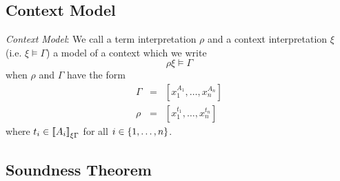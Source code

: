 \subsection{Context Model}

\begin{definition}
    \label{DefinitionContextModel}
    \emph{Context Model}: We call a term interpretation $\rho$ and a context
    interpretation $\xi$ (i.e. $\xi \vDash \Gamma$) a model of a context which
    we write
    $$
        \rho\xi \vDash \Gamma
    $$
    when
    $\rho$ and $\Gamma$ have the form
    $$
    \begin{array}{lll}
        \Gamma &=& [x_1^{A_1}, \ldots, x_n^{A_n}]
        \\
        \rho   &=& [x_1^{t_1}, \ldots, x_n^{t_n}]
    \end{array}
    $$
    where $t_i \in {{[\![}A_i{]\!]}}_{\xi\Gamma}$ for all $i \in {\{1,\ldots,n\}}$.
\end{definition}




\subsection{Soundness Theorem}

